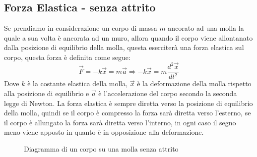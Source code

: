     \subsection{Forza Elastica - senza attrito}
        Se prendiamo in considerazione un corpo di massa $m$ ancorato ad una molla la quale a sua volta è ancorata ad un muro, allora quando il corpo viene allontanato dalla posizione di equilibrio della molla, questa eserciterà una forza elastica sul corpo, questa forza è definita come segue:
        $$
            \vec{F}=-k\vec{x}=m\vec{a}\Rightarrow -k\vec{x} = m\frac{d^2\vec{x}}{dt^2}
        $$
        Dove $k$ è la costante elastica della molla, $\vec{x}$ è la deformazione della molla rispetto alla posizione di equilibrio e $\vec{a}$ è l'accelerazione del corpo secondo la seconda legge di Newton. La forza elastica è sempre diretta verso la posizione di equilibrio della molla, quindi se il corpo è compresso la forza sarà diretta verso l'esterno, se il corpo è allungato la forza sarà diretta verso l'interno, in ogni caso il segno meno viene apposto in quanto è in opposizione alla deformazione.
        \begin{figure}[H]
            \centering
            \caption{Diagramma di un corpo su una molla senza attrito}
        \end{figure}
